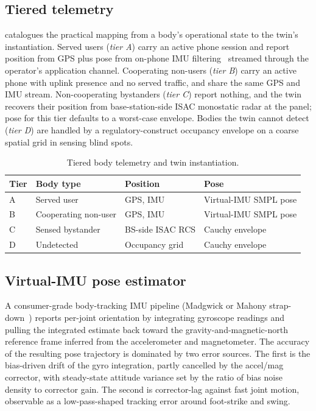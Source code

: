 \documentclass[journal,twocolumn,10pt]{IEEEtran}
\theoremstyle{plain}
\theoremstyle{remark}
\begin{document}
\subsection{Tiered telemetry}\label{sec:tiers}

 catalogues the practical mapping from a body's
operational state to the twin's instantiation. Served users
(\emph{tier A}) carry an active phone session and report position
from GPS plus pose from on-phone IMU
filtering~\cite{Madgwick2011} streamed through the operator's
application channel. Cooperating non-users (\emph{tier B}) carry an
active phone with uplink presence and no served traffic, and share
the same GPS and IMU stream. Non-cooperating bystanders
(\emph{tier C}) report nothing, and the twin recovers their position
from base-station-side ISAC monostatic radar at the panel; pose for
this tier defaults to a worst-case envelope. Bodies the twin cannot
detect (\emph{tier D}) are handled by a regulatory-construct
occupancy envelope on a coarse spatial grid in sensing blind spots.

\begin{table}[!t]
\caption{Tiered body telemetry and twin instantiation.}
\label{tab:tiers}
\centering
\small
\begin{tabular}{@{}p{}p{}p{}p{}@{}}
\toprule
Tier & Body type & Position & Pose \\
\midrule
A & Served user & GPS, IMU & Virtual-IMU SMPL pose \\
B & Cooperating non-user & GPS, IMU & Virtual-IMU SMPL pose \\
C & Sensed bystander & BS-side ISAC RCS & Cauchy envelope \\
D & Undetected & Occupancy grid & Cauchy envelope \\
\bottomrule
\end{tabular}
\end{table}

\subsection{Virtual-IMU pose estimator}\label{sec:imu}

A consumer-grade body-tracking IMU pipeline (Madgwick or Mahony
strap-down~\cite{Madgwick2011}) reports
per-joint orientation by integrating gyroscope readings and pulling
the integrated estimate back toward the gravity-and-magnetic-north
reference frame inferred from the accelerometer and magnetometer.
The accuracy of the resulting pose trajectory is dominated by two
error sources. The first is the bias-driven drift of the gyro
integration, partly cancelled by the accel/mag corrector, with
steady-state attitude variance set by the ratio of bias noise density
to corrector gain. The second is corrector-lag against fast joint
motion, observable as a low-pass-shaped tracking error around
foot-strike and swing.
\end{document}
